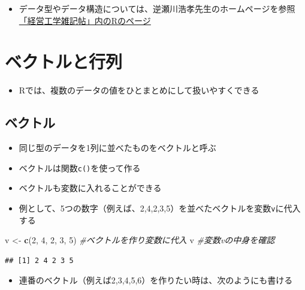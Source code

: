 \documentclass[
]{book}
\newenvironment{Shaded}{\begin{snugshade}}{\end{snugshade}}
\newcommand{\CommentTok}[1]{\textcolor[rgb]{0.56,0.35,0.01}{\textit{#1}}}
\newcommand{\DecValTok}[1]{\textcolor[rgb]{0.00,0.00,0.81}{#1}}
\newcommand{\FunctionTok}[1]{\textcolor[rgb]{0.13,0.29,0.53}{\textbf{#1}}}
\newcommand{\NormalTok}[1]{#1}
\newcommand{\OtherTok}[1]{\textcolor[rgb]{0.56,0.35,0.01}{#1}}
\providecommand{\tightlist}{%
  \setlength{\itemsep}{0pt}\setlength{\parskip}{0pt}}
\begin{document}
\begin{itemize}
\tightlist
\item
  データ型やデータ構造については、逆瀬川浩孝先生のホームページを参照\\
  \href{http://www.f.waseda.jp/sakas/R/index.html}{「経営工学雑記帖」内のRのページ}
\end{itemize}

\hypertarget{ux30d9ux30afux30c8ux30ebux3068ux884cux5217}{%
\section{ベクトルと行列}\label{ux30d9ux30afux30c8ux30ebux3068ux884cux5217}}

\begin{itemize}
\tightlist
\item
  Rでは、複数のデータの値をひとまとめにして扱いやすくできる
\end{itemize}

\hypertarget{ux30d9ux30afux30c8ux30eb}{%
\subsection{ベクトル}\label{ux30d9ux30afux30c8ux30eb}}

\begin{itemize}
\tightlist
\item
  同じ型のデータを1列に並べたものをベクトルと呼ぶ
\item
  ベクトルは関数\texttt{c()}を使って作る
\item
  ベクトルも変数に入れることができる
\item
  例として、5つの数字（例えば、2,4,2,3,5）を並べたベクトルを変数\texttt{v}に代入する
\end{itemize}

\begin{Shaded}
\begin{Highlighting}[]
\NormalTok{v }\OtherTok{\textless{}{-}} \FunctionTok{c}\NormalTok{(}\DecValTok{2}\NormalTok{, }\DecValTok{4}\NormalTok{, }\DecValTok{2}\NormalTok{, }\DecValTok{3}\NormalTok{, }\DecValTok{5}\NormalTok{) }\CommentTok{\#ベクトルを作り変数に代入}
\NormalTok{v }\CommentTok{\#変数vの中身を確認}
\end{Highlighting}
\end{Shaded}

\begin{verbatim}
## [1] 2 4 2 3 5
\end{verbatim}

\begin{itemize}
\tightlist
\item
  連番のベクトル（例えば2,3,4,5,6）を作りたい時は、次のようにも書ける
\end{itemize}
\end{document}
